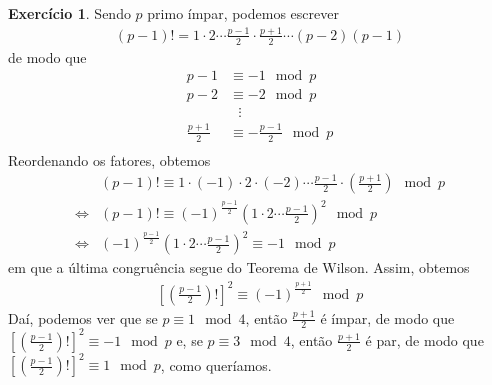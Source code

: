 \documentclass[a4paper,12pt]{article}
\theoremstyle{definition}
\newtheorem{exercise}{Exercício}%
\begin{document}
	\begin{exercise}
		Sendo $p$ primo ímpar, podemos escrever
		\begin{align*}
		(p-1)! = 1\cdot 2 \cdots \frac{p-1}{2}\cdot\frac{p+1}{2}\cdots (p-2)(p-1)
		\end{align*}
		de modo que
		\begin{align*}
		p-1 &\equiv -1\mod p \\
		p-2 &\equiv -2\mod p \\
		&\text{   }\vdots \\
		\frac{p+1}{2} &\equiv -\frac{p-1}{2}\mod p \\
		\end{align*}
		Reordenando os fatores, obtemos
		\begin{align*}
		&(p-1)! \equiv 1\cdot (-1)\cdot 2\cdot(-2)\cdots\frac{p-1}{2}\cdot\left( \frac{p+1}{2} \right) \mod p \\
		\Leftrightarrow& (p-1)! \equiv (-1)^{\frac{p-1}{2}}\left( 1\cdot 2\cdots \frac{p-1}{2} \right)^2\mod p \\
		\Leftrightarrow& (-1)^{\frac{p-1}{2}}\left( 1\cdot 2\cdots \frac{p-1}{2} \right)^2 \equiv -1\mod p 
		\end{align*}
		em que a última congruência segue do Teorema de Wilson. Assim, obtemos
		\begin{align*}
		\left[ \left( \frac{p-1}{2} \right)! \right]^2 \equiv (-1)^{\frac{p+1}{2}}\mod p
		\end{align*}
		Daí, podemos ver que se $p\equiv 1\mod 4$, então $\displaystyle{\frac{p+1}{2}}$ é ímpar, de modo que $\displaystyle{ \left[ \left( \frac{p-1}{2} \right)! \right]^2 \equiv -1\mod p}$ e, se $p\equiv 3\mod 4$, então $\displaystyle{\frac{p+1}{2}}$ é par, de modo que $\displaystyle{ \left[ \left( \frac{p-1}{2} \right)! \right]^2 \equiv 1\mod p}$, como queríamos.
	\end{exercise}
\end{document}
